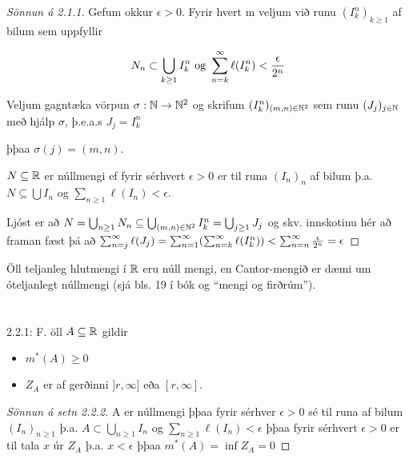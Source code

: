 \documentclass[12pt]{book} \usepackage[utf8]{inputenc}
\begin{document}
\begin{proof}[Sönnun á 2.1.1]

  Gefum okkur $\epsilon > 0$. Fyrir hvert m veljum við runu
  $(I^n_k)_{k \geq 1}$ af bilum sem uppfyllir

  \[N_n \subset \bigcup_{k \geq 1} I_k^n \text{ og } \sum_{n = {k}}^{\infty}
  \ell(I^n_k) < \frac{\epsilon}{2^n}\]

  Veljum gagntæka vörpun $\sigma: \mathbb{N} \to \mathbb{N}^2$ og skrifum
  $(I^n_k)_{(m,n) \in \mathbb{N}^2}$ sem runu $(J_j)_{j \in \mathbb{N}}$ með hjálp
  $\sigma$, þ.e.a.s $J_j = I^n_k$

  þþaa $\sigma (j) = (m,n)$.

\begin{ath}
  $N \subseteq \mathbb{R}$ er núllmengi ef fyrir sérhvert $\epsilon > 0$ er
  til runa $(I_n)_{n}$ af bilum þ.a.  $N \subseteq \bigcup I_n$ og
  $\sum_{n \geq 1} \ell(I_n) < \epsilon$.

\end{ath}

Ljóst er að
$N = \bigcup_{n \geq 1} N_n \subseteq \bigcup_{(m,n) \in \mathbb{N}^2} I^n_k =
\bigcup_{j \geq 1} J_j$
og skv. innskotinu hér að framan fæst þá að
$\sum_{n = {j}}^{\infty} \ell(J_j) = \sum_{n = 1}^{\infty} ( \sum_{n = {k}}^{\infty} \ell(I_k^n)) <
\sum_{n = {n}}^{\infty} \frac{\epsilon}{2^n} = \epsilon$

\end{proof}

\begin{daemi}

  Öll teljanleg hlutmengi í $\mathbb{R}$ eru núll mengi, en Cantor-mengið er
  dæmi um óteljanlegt núllmengi (sjá bls. 19 í bók og ``mengi og
  firðrúm'').
\end{daemi}


\section{}
\begin{ath}2.2.1: F. öll $A \subseteq \mathbb{R}$ gildir
  \begin{itemize}
  \item $m^*(A) \geq 0$
  
  \item $Z_A$ er af gerðinni $]r, \infty]$ eða $[r,\infty]$.
  \end{itemize}
\end{ath}
\begin{proof}[Sönnun á setn 2.2.2]
  A er núllmengi þþaa fyrir sérhver $\epsilon > 0$ sé til runa af
  bilum $(I_n)_{n \geq 1}$ þ.a. $A \subset \bigcup_{n \geq 1} I_n$ og
  $\sum_{n \geq 1} \ell(I_n) < \epsilon$ þþaa fyrir sérhvert
  $\epsilon > 0$ er til tala $x$ úr $Z_A$ þ.a. $x < \epsilon$ þþaa
  $m^*(A) = \inf{Z_A} = 0$
\end{proof}
\end{document}
